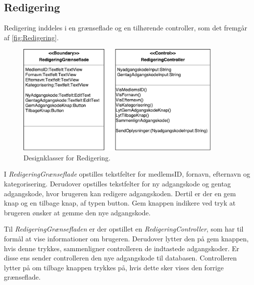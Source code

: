 \subsection*{Redigering}
Redigering inddeles i en grænseflade og en tilhørende controller, som det fremgår af \autoref{fig:Redigering}. 

\begin{figure} [H]
\centering
\includegraphics[width=0.9\textwidth]{figures/MVC/Redigering}
\caption{Designklasser for Redigering.}
\label{fig:Redigering}
\end{figure}


\noindent
I \textit{RedigeringGrænseflade} opstilles tekstfelter for medlemsID, fornavn, efternavn og kategorisering. Derudover opstilles tekstfelter for ny adgangskode og gentag adgangskode, hvor brugeren kan redigere adgangskoden. Dertil er der en gem knap og en tilbage knap, af typen button. Gem knappen indikere ved tryk at brugeren ønsker at gemme den nye adgangskode. 


Til \textit{RedigeringGrænsefladen} er der opstillet en \textit{RedigeringController}, som har til formål at vise informationer om brugeren. Derudover lytter den på gem knappen, hvis denne trykkes, sammenligner controlleren de indtastede adgangskoder. Er disse ens sender controlleren den  nye adgangskode til databasen. Controlleren lytter på om tilbage knappen trykkes på, hvis dette sker vises den forrige grænseflade.  

